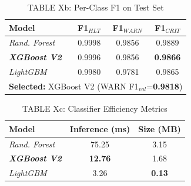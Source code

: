 \documentclass[conference]{IEEEtran}
\begin{document}
\begin{table}[htbp]
\caption{TABLE Xb: Per-Class F1 on Test Set}
\centering
\begin{tabular}{lccc}
\hline
\textbf{Model} & \textbf{F1$_{HLT}$} & \textbf{F1$_{WARN}$} & \textbf{F1$_{CRIT}$} \\
\hline
\textit{Rand. Forest}        & 0.9998 & 0.9856 & 0.9889 \\
\textbf{\textit{XGBoost V2}} & 0.9996 & 0.9856 & \textbf{0.9866} \\
\textit{LightGBM}            & 0.9980 & 0.9781 & 0.9865 \\
\hline
\multicolumn{4}{l}{\textbf{Selected:} XGBoost V2 (WARN F1$_{val}$=\textbf{0.9818})} \\
\hline
\end{tabular}
\label{tab:clf_results_b}
\end{table}

\begin{table}[htbp]
\caption{TABLE Xc: Classifier Efficiency Metrics}
\centering
\begin{tabular}{lcc}
\hline
\textbf{Model} & \textbf{Inference (ms)} & \textbf{Size (MB)} \\
\hline
\textit{Rand. Forest}        & 75.25          & 3.15 \\
\textbf{\textit{XGBoost V2}} & \textbf{12.76} & 1.68 \\
\textit{LightGBM}            & 3.26           & \textbf{0.13} \\
\hline
\end{tabular}
\label{tab:clf_results_c}
\end{table}

\end{document}
